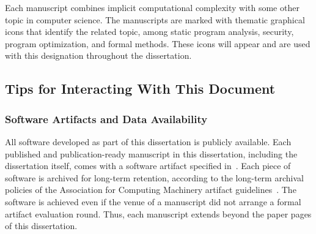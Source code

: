 Each manuscript combines implicit computational complexity with some other topic in computer science.
The manuscripts are marked with thematic graphical icons that identify the related topic, among static program analysis, security, program optimization, and formal methods.
These icons will appear and are used with this designation throughout the dissertation.



\subsection{Tips for Interacting With This Document}
\label{subsec:tips}

\subsubsection{Software Artifacts and Data Availability}\label{subsub:sw}

All software developed as part of this dissertation is publicly available.
Each published and publication-ready manuscript in this dissertation, including the dissertation itself, comes with a software artifact specified in~.
Each piece of software is archived for long-term retention, according to the long-term archival policies of the Association for Computing Machinery artifact guidelines~\cite{acm_badging}.
The software is achieved even if the venue of a manuscript did not arrange a formal artifact evaluation round.
Thus, each manuscript extends beyond the paper pages of this dissertation.

